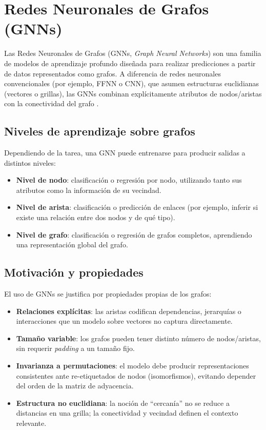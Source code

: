 \section{Redes Neuronales de Grafos (GNNs)} \label{sec:anexo_gnns}

Las Redes Neuronales de Grafos (GNNs, \textit{Graph Neural Networks}) son una familia de modelos de aprendizaje profundo diseñada para realizar predicciones a partir de datos representados como grafos. A diferencia de redes neuronales convencionales (por ejemplo, FFNN o CNN), que asumen estructuras euclidianas (vectores o grillas), las GNNs combinan explícitamente atributos de nodos/aristas con la conectividad del grafo \cite{gnnReviewMethods}.

\subsection{Niveles de aprendizaje sobre grafos}

Dependiendo de la tarea, una GNN puede entrenarse para producir salidas a distintos niveles:
\begin{itemize}
    \item \textbf{Nivel de nodo}: clasificación o regresión por nodo, utilizando tanto sus atributos como la información de su vecindad.
    \item \textbf{Nivel de arista}: clasificación o predicción de enlaces (por ejemplo, inferir si existe una relación entre dos nodos y de qué tipo).
    \item \textbf{Nivel de grafo}: clasificación o regresión de grafos completos, aprendiendo una representación global del grafo.
\end{itemize}

\subsection{Motivación y propiedades}

El uso de GNNs se justifica por propiedades propias de los grafos:
\begin{itemize}
    \item \textbf{Relaciones explícitas}: las aristas codifican dependencias, jerarquías o interacciones que un modelo sobre vectores no captura directamente.
    \item \textbf{Tamaño variable}: los grafos pueden tener distinto número de nodos/aristas, sin requerir \textit{padding} a un tamaño fijo.
    \item \textbf{Invarianza a permutaciones}: el modelo debe producir representaciones consistentes ante re-etiquetados de nodos (isomorfismos), evitando depender del orden de la matriz de adyacencia.
    \item \textbf{Estructura no euclidiana}: la noción de ``cercanía'' no se reduce a distancias en una grilla; la conectividad y vecindad definen el contexto relevante.
\end{itemize}

